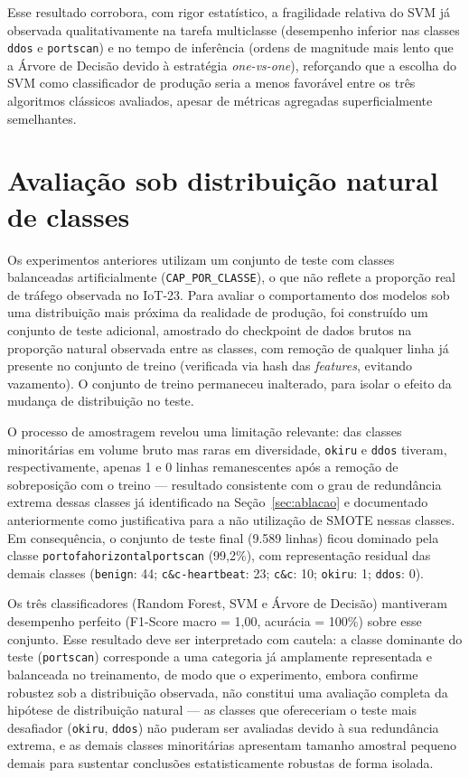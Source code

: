 Esse resultado corrobora, com rigor estatístico, a fragilidade relativa do SVM já observada qualitativamente na tarefa multiclasse (desempenho inferior nas classes \texttt{ddos} e \texttt{portscan}) e no tempo de inferência (ordens de magnitude mais lento que a Árvore de Decisão devido à estratégia \textit{one-vs-one}), reforçando que a escolha do SVM como classificador de produção seria a menos favorável entre os três algoritmos clássicos avaliados, apesar de métricas agregadas superficialmente semelhantes.

\section{Avaliação sob distribuição natural de classes}
\label{sec:distribuicao-natural}

Os experimentos anteriores utilizam um conjunto de teste com classes balanceadas artificialmente (\texttt{CAP\_POR\_CLASSE}), o que não reflete a proporção real de tráfego observada no IoT-23. Para avaliar o comportamento dos modelos sob uma distribuição mais próxima da realidade de produção, foi construído um conjunto de teste adicional, amostrado do checkpoint de dados brutos na proporção natural observada entre as classes, com remoção de qualquer linha já presente no conjunto de treino (verificada via hash das \textit{features}, evitando vazamento). O conjunto de treino permaneceu inalterado, para isolar o efeito da mudança de distribuição no teste.

O processo de amostragem revelou uma limitação relevante: das classes minoritárias em volume bruto mas raras em diversidade, \texttt{okiru} e \texttt{ddos} tiveram, respectivamente, apenas 1 e 0 linhas remanescentes após a remoção de sobreposição com o treino — resultado consistente com o grau de redundância extrema dessas classes já identificado na Seção~\ref{sec:ablacao} e documentado anteriormente como justificativa para a não utilização de SMOTE nessas classes. Em consequência, o conjunto de teste final (9.589 linhas) ficou dominado pela classe \texttt{portofahorizontalportscan} (99,2\%), com representação residual das demais classes (\texttt{benign}: 44; \texttt{c\&c-heartbeat}: 23; \texttt{c\&c}: 10; \texttt{okiru}: 1; \texttt{ddos}: 0).

Os três classificadores (Random Forest, SVM e Árvore de Decisão) mantiveram desempenho perfeito (F1-Score macro = 1{,}00, acurácia = 100\%) sobre esse conjunto. Esse resultado deve ser interpretado com cautela: a classe dominante do teste (\texttt{portscan}) corresponde a uma categoria já amplamente representada e balanceada no treinamento, de modo que o experimento, embora confirme robustez sob a distribuição observada, não constitui uma avaliação completa da hipótese de distribuição natural — as classes que ofereceriam o teste mais desafiador (\texttt{okiru}, \texttt{ddos}) não puderam ser avaliadas devido à sua redundância extrema, e as demais classes minoritárias apresentam tamanho amostral pequeno demais para sustentar conclusões estatisticamente robustas de forma isolada.


